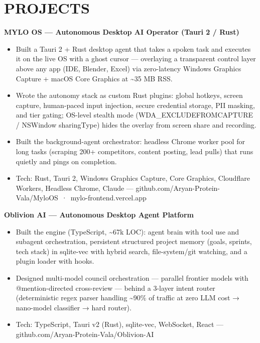\documentclass[9pt]{article}
\begin{document}
\section*{PROJECTS}
\textbf{MYLO OS  ---  Autonomous Desktop AI Operator (Tauri 2 / Rust)}
\vspace{1pt}
\begin{itemize}[leftmargin=11pt,itemsep=0pt,topsep=1pt,parsep=0pt]
\item Built a Tauri 2 + Rust desktop agent that takes a spoken task and executes it on the live OS with a ghost cursor  ---  overlaying a transparent control layer above any app (IDE, Blender, Excel) via zero-latency Windows Graphics Capture + macOS Core Graphics at \textasciitilde{}35 MB RSS.
\item Wrote the autonomy stack as custom Rust plugins: global hotkeys, screen capture, human-paced input injection, secure credential storage, PII masking, and tier gating; OS-level stealth mode (WDA\_EXCLUDEFROMCAPTURE / NSWindow sharingType) hides the overlay from screen share and recording.
\item Built the background-agent orchestrator: headless Chrome worker pool for long tasks (scraping 200+ competitors, content posting, lead pulls) that runs quietly and pings on completion.
\item Tech: Rust, Tauri 2, Windows Graphics Capture, Core Graphics, Cloudflare Workers, Headless Chrome, Claude  ---  github.com/Aryan-Protein-Vala/MyloOS \,·\, mylo-frontend.vercel.app
\end{itemize}
\textbf{Oblivion AI  ---  Autonomous Desktop Agent Platform}
\vspace{1pt}
\begin{itemize}[leftmargin=11pt,itemsep=0pt,topsep=1pt,parsep=0pt]
\item Built the engine (TypeScript, \textasciitilde{}67k LOC): agent brain with tool use and subagent orchestration, persistent structured project memory (goals, sprints, tech stack) in sqlite-vec with hybrid search, file-system/git watching, and a plugin loader with hooks.
\item Designed multi-model council orchestration  ---  parallel frontier models with @mention-directed cross-review  ---  behind a 3-layer intent router (deterministic regex parser handling \textasciitilde{}90\% of traffic at zero LLM cost → nano-model classifier → hard router).
\item Tech: TypeScript, Tauri v2 (Rust), sqlite-vec, WebSocket, React  ---  github.com/Aryan-Protein-Vala/Oblivion-AI
\end{itemize}
\end{document}
